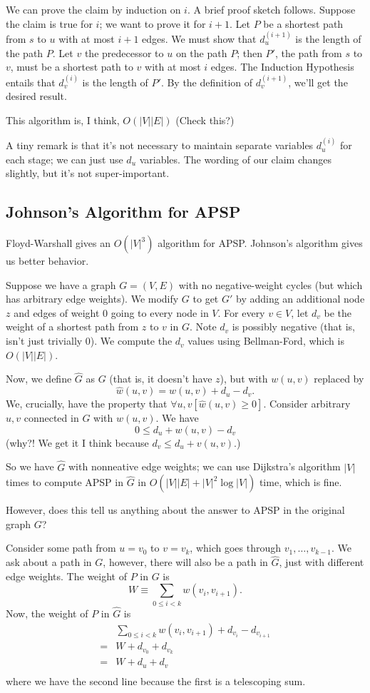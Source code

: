 \documentclass{article}
\begin{document}
We can prove the claim by induction on $i$.
A brief proof sketch follows.
Suppose the claim is true for $i$; we want to prove it for $i+1$.
Let $P$ be a shortest path from $s$ to $u$ with at most $i+1$ edges.
We must show that $d_u^{(i+1)}$ is the length of the path $P$.
Let $v$ the predecessor to $u$ on the path $P$; then $P'$, the
path from $s$ to $v$, must be a shortest path to $v$ with at most
$i$ edges.
The Induction Hypothesis entails that $d_v^{(i)}$ is the length of $P'$.
By the definition of $d_v^{(i+1)}$, we'll get the desired result.

This algorithm is, I think, $O(|V| |E|)$ (Check this?)

A tiny remark is that it's not necessary to maintain separate variables
$d_u^{(i)}$ for each stage; we can just use $d_u$ variables.
The wording of our claim changes slightly, but it's not super-important.

\subsection{Johnson's Algorithm for APSP}

Floyd-Warshall gives an $O(|V|^3)$ algorithm for APSP.
Johnson's algorithm gives us better behavior.

Suppose we have a graph $G = (V,E)$ with no negative-weight cycles (but which 
has arbitrary edge weights).
We modify $G$ to get $G'$ by adding an additional node $z$ and edges of
weight $0$ going to every node in $V$.
For every $v\in V$, let $d_v$ be the weight of a shortest path from $z$ to $v$
in $G$.
Note $d_v$ is possibly negative (that is, isn't just trivially 0).
We compute the $d_v$ values using Bellman-Ford, which is $O(|V| |E|)$.

Now, we define $\widehat G$ as $G$ (that is, it doesn't have $z$), but with
$w(u,v)$ replaced by
$$
\widehat w(u,v) = w(u,v) + d_u - d_v.
$$
We, crucially, have the property that $\forall u,v[\widehat w(u,v) \geq 0]$.
Consider arbitrary $u,v$ connected in $G$ with $w(u,v)$.
We have
$$
0 \leq d_u + w(u, v) - d_v
$$
(why?! We get it I think because $d_v \leq d_u + v(u,v)$.)

So we have $\widehat G$ with nonneative edge weights; we can use Dijkstra's
algorithm $|V|$ times to compute APSP in $\widehat G$ in
$ O(|V|  |E| + |V|^2\log |V|)$
time, which is fine.

However, does this tell us anything about the answer to APSP in the original
graph $G$?

Consider some path from $u = v_0$ to $v = v_k$, which goes through
$v_1, \ldots, v_{k-1}$.
We ask about a path in $G$, however, there will also be a path in $\widehat G$,
just with different edge weights.
The weight of $P$ in $G$ is 
$$
W \equiv
\sum_{0\leq i < k}
w(v_i, v_{i+1}).
$$
Now, the weight of $P$ in $\widehat G$ is
\begin{align*}
& \sum_{0\leq i < k} w(v_i, v_{i+1}) + d_{v_i} - d_{v_{i+1}} \\
= & W + d_{v_0} + d_{v_k} \\
= & W + d_{u} + d_{v} \\
\end{align*}
where we have the second line because the first is a telescoping sum.
\end{document}

